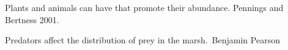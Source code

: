 \documentclass[t]{beamer}
\begin{document}
%
{
\begin{frame}[b]{Plants and animals can have  that promote their abundance.}
\tiny Pennings and Bertness 2001. 
\end{frame}
}
%
{
\begin{frame}[b]{Predators affect the distribution of prey in the marsh.}
\tiny\textcopyright\,Benjamin Pearson
\end{frame}
}
%
\end{document}
